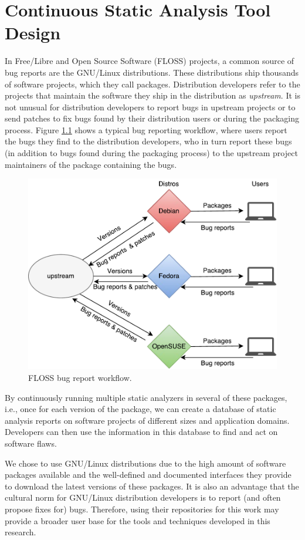 \chapter{Continuous Static Analysis Tool Design}
\label{ch:kiskadee}

In Free/Libre and Open Source Software (FLOSS) projects, a
common source of bug reports are the GNU/Linux distributions.
These distributions ship thousands of software projects, which
they call packages. Distribution developers refer to the
projects that maintain the software they ship in the
distribution as \textit{upstream}.  It is not unusual for
distribution developers to report bugs in upstream projects or
to send patches to fix bugs found by their distribution users
or during the packaging process. Figure
\ref{fig:floss_bugs_workflow} shows a typical bug reporting
workflow, where users report the bugs they find to the
distribution developers, who in turn report these bugs (in
addition to bugs found during the packaging process) to the
upstream project maintainers of the package containing the bugs.

\begin{figure}[!h]
  \centering
  \includegraphics[width=.75\textwidth]{figures/floss_bugs_workflow} 
  \caption{FLOSS bug report workflow.}
  \label{fig:floss_bugs_workflow} 
\end{figure}

By continuously running multiple static analyzers in several of these packages,
i.e., once for each version of the package, we can create a database of static
analysis reports on software projects of different sizes and application
domains. Developers can then use the information in this database to find and
act on software flaws.

We chose to use GNU/Linux distributions due to the high amount
of software packages available and the well-defined and
documented interfaces they provide to download the latest
versions of these packages. It is also an advantage that the
cultural norm for GNU/Linux distribution developers is to
report (and often propose fixes for) bugs. Therefore, using
their repositories for this work may provide a broader user
base for the tools and techniques developed in this research.

